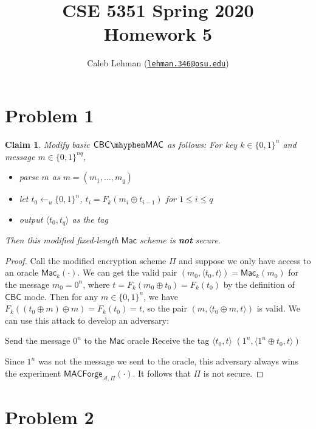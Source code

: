 \documentclass[12pt]{article}
\title{%
CSE 5351 Spring 2020\\
Homework 5
}
\author{%
Caleb Lehman
(\href{mailto:lehman.346@osu.edu}{\texttt{lehman.346@osu.edu}})
}
\date{%
}
\numberwithin{equation}{section}
\theoremstyle{plain}
\newtheorem{claim}{Claim}
\newcommand{\set}[1]{\{ #1 \}}
\newcommand{\algo}[1]{\mathsf{#1}}
\newcommand{\adv}{\mathcal{A}}
\newcommand{\mac}{\algo{Mac}}
\newcommand{\macexpir}[2]{\algo{MACForge}_{{#1},{#2}}}
\begin{document}
\maketitle

\section*{Problem 1}

\begin{claim}
Modify basic $\algo{CBC}\mhyphen \algo{MAC}$ as follows:
For key $k \in \set{ 0, 1 }^n$ and message $m \in \set{ 0, 1 }^{nq}$,
\begin{itemize}
    \item parse $m$ as $m = (m_1, \ldots, m_q)$
    \item let $t_0 \gets_u \set{ 0, 1 }^n$,
    $t_i = F_k(m_i \oplus t_{i-1})$ for $1 \leq i \leq q$
    \item output $\langle t_0, t_q \rangle$ as the tag
\end{itemize}
Then this modified fixed-length $\mac$ scheme is \textbf{not} secure.
\end{claim}
\begin{proof}
Call the modified encryption scheme $\Pi$
and suppose we only have access to an oracle $\mac_k(\cdot)$.
We can get the valid pair $(m_0, \langle t_0, t \rangle) = \mac_k(m_0)$ for the message $m_0 = 0^n$,
where $t = F_k(m_0 \oplus t_0) = F_k(t_0)$ by the definition of $\algo{CBC}$ mode.
Then for any $m \in \set{ 0, 1 }^n$, we have
$F_k((t_0 \oplus m) \oplus m) = F_k(t_0) = t$,
so the pair $(m, \langle t_0 \oplus m, t \rangle)$ is valid.
We can use this attack to develop an adversary:
\begin{algorithm}[H]
\begin{algorithmic}
    \State Send the message $0^n$ to the $\mac$ oracle
    \State Receive the tag $\langle t_0, t \rangle$
    \State \Return $(1^n, \langle 1^n \oplus t_0, t \rangle)$
\EndProcedure
\end{algorithmic}
\end{algorithm}
Since $1^n$ was not the message we sent to the oracle,
this adversary always wins the experiment $\macexpir{\adv}{\Pi}(\cdot)$.
It follows that $\Pi$ is not secure.
\end{proof}

\newpage
\section*{Problem 2}
\end{document}
